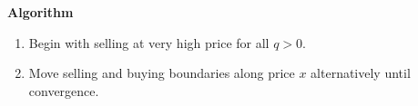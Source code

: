 \documentclass{beamer}
\begin{document}
\begin{frame}
{\bf Algorithm}
\begin{enumerate}
  \item Begin with selling at very high price for all $q>0$.
  \item Move selling and buying boundaries along price $x$ alternatively until convergence. 



\end{enumerate}

\end{frame}


%
%
%
%
%
%
%
%
%
%
\end{document}
